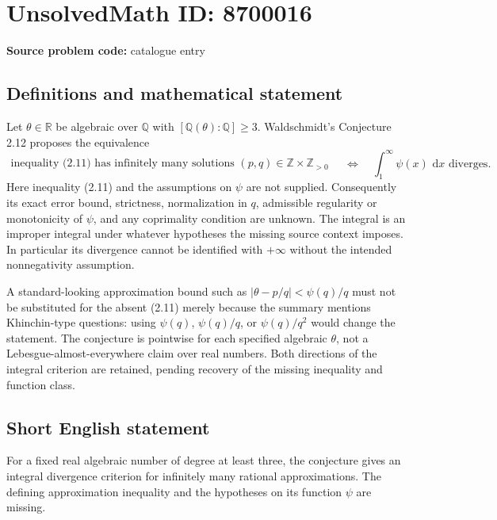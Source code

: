 \documentclass[11pt]{article}
\newcommand{\Z}{\mathbb{Z}}
\newcommand{\Q}{\mathbb{Q}}
\newcommand{\R}{\mathbb{R}}
\newcommand{\dd}{\,\mathrm{d}}
\begin{document}
\section*{UnsolvedMath ID: 8700016}
\textbf{Source problem code:} catalogue entry
\subsection{Definitions and mathematical statement}
Let \(\theta\in\R\) be algebraic over \(\Q\) with \([\Q(\theta):\Q]\geq3\). Waldschmidt's Conjecture 2.12 proposes the equivalence
\[
 \begin{gathered}
 \text{inequality (2.11) has infinitely many solutions }(p,q)\in\Z\times\Z_{>0}
 \end{gathered}
 \quad\Longleftrightarrow\quad
 \int_1^\infty\psi(x)\,\dd x\text{ diverges}.
\]
Here inequality (2.11) and the assumptions on \(\psi\) are not supplied. Consequently its exact error bound, strictness, normalization in \(q\), admissible regularity or monotonicity of \(\psi\), and any coprimality condition are unknown. The integral is an improper integral under whatever hypotheses the missing source context imposes. In particular its divergence cannot be identified with \(+\infty\) without the intended nonnegativity assumption.

A standard-looking approximation bound such as \(|\theta-p/q|<\psi(q)/q\) must not be substituted for the absent (2.11) merely because the summary mentions Khinchin-type questions: using \(\psi(q)\), \(\psi(q)/q\), or \(\psi(q)/q^2\) would change the statement. The conjecture is pointwise for each specified algebraic \(\theta\), not a Lebesgue-almost-everywhere claim over real numbers. Both directions of the integral criterion are retained, pending recovery of the missing inequality and function class.
\subsection{Short English statement}
For a fixed real algebraic number of degree at least three, the conjecture gives an integral divergence criterion for infinitely many rational approximations. The defining approximation inequality and the hypotheses on its function \(\psi\) are missing.
\end{document}
